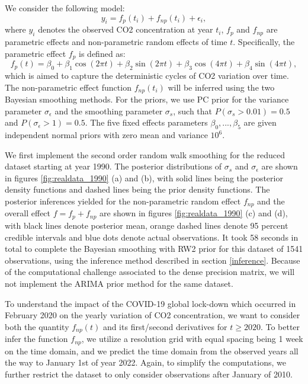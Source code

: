 \documentclass{article}
\begin{document}
We consider the following model: $$y_i = f_{p}(t_i) + f_{np}(t_i) + \epsilon_i,$$ where $y_i$ denotes the observed CO2 concentration at year $t_i$, $f_{p}$ and $f_{np}$ are parametric effects and non-parametric random effects of time $t$. Specifically, the parametric effect $f_{p}$ is defined as: $$f_{p}(t) = \beta_0 + \beta_1 \cos(2\pi t) + \beta_2 \sin(2 \pi t) + \beta_3 \cos(4\pi t) + \beta_4 \sin(4\pi t),$$ which is aimed to capture the deterministic cycles of CO2 variation over time. The non-parametric effect function $f_{np}(t_i)$ will be inferred using the two Bayesian smoothing methods. For the priors, we use PC prior for the variance parameter $\sigma_\epsilon$ and the smoothing parameter $\sigma_s$, such that $P(\sigma_s > 0.01) = 0.5$ and $P(\sigma_\epsilon > 1) = 0.5$. The five fixed effects parameters $\beta_0, ..., \beta_5$ are given independent normal priors with zero mean and variance $10^6$.  


We first implement the second order random walk smoothing for the reduced dataset starting at year 1990. The posterior distributions of $\sigma_s$ and $\sigma_\epsilon$ are shown in figures \ref{fig:realdata_1990} (a) and (b), with solid lines being the posterior density functions and dashed lines being the prior density functions. The posterior inferences yielded for the non-parametric random effect $f_{np}$ and the overall effect $f = f_p + f_{np}$ are shown in figures \ref{fig:realdata_1990} (c) and (d), with black lines denote posterior mean, orange dashed lines denote 95 percent credible intervals and blue dots denote actual observations. It took 58 seconds in total to complete the Bayesian smoothing with RW2 prior for this dataset of 1541 observations, using the inference method described in section \ref{inference}. Because of the computational challenge associated to the dense precision matrix, we will not implement the ARIMA prior method for the same dataset.


To understand the impact of the COVID-19 global lock-down which occurred in February 2020 on the yearly variation of CO2 concentration, we want to consider both the quantity $f_{np}(t)$ and its first/second derivatives for $t \geq 2020$. To better infer the function $f_{np}$, we utilize a resolution grid with equal spacing being 1 week on the time domain, and we predict the time domain from the observed years all the way to January 1st of year 2022. Again, to simplify the computations, we further restrict the dataset to only consider observations after January of 2010.
\end{document}
